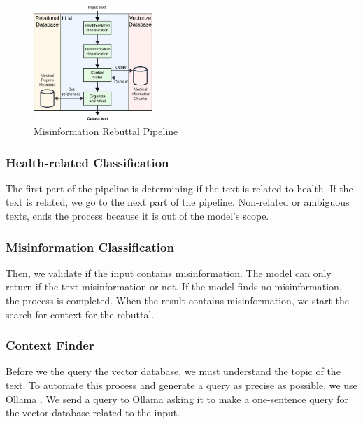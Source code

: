 \begin{figure}[htbp]
	\begin{center}
		\includegraphics[width=0.4\textwidth]{figures/LLM_Pipeline.jpeg} %
	\end{center}
	\caption{Misinformation Rebuttal Pipeline} %
	\label{fig:llm}
\end{figure}


\subsubsection{Health-related Classification}
The first part of the pipeline is determining if the text is related to health. If the text is related, we go to the next part of the pipeline. Non-related or ambiguous texts, ends the process because it is out of the model's scope. 

\subsubsection{Misinformation Classification}
Then, we validate if the input contains misinformation. The model can only return if the text misinformation or not. If the model finds no misinformation, the process is completed. When the result contains misinformation, we start the search for context for the rebuttal.

\subsubsection{Context Finder}
Before we the query the vector database, we must understand the topic of the text. To automate this process and generate a query as precise as possible, we use Ollama \cite{ollama}. We send a query to Ollama asking it to make a one-sentence query for the vector database related to the input.

